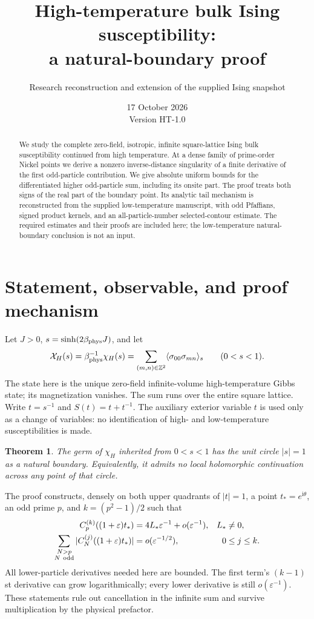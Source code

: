 \documentclass[11pt]{article}
\title{High-temperature bulk Ising susceptibility:\\a natural-boundary proof}
\author{Research reconstruction and extension of the supplied Ising snapshot}
\date{17 October 2026\\Version HT-1.0}
\numberwithin{equation}{section}
\newtheorem{theorem}{Theorem}[section]
\theoremstyle{definition}
\newcommand{\ii}{\mathrm i}
\newcommand{\Z}{\mathbb Z}
\newcommand{\eps}{\varepsilon}
\begin{document}
\maketitle
\begin{abstract}
We study the complete zero-field, isotropic, infinite square-lattice
Ising bulk susceptibility continued from high temperature. At a dense
family of prime-order Nickel points we derive a nonzero inverse-distance
singularity of a finite derivative of the first odd-particle contribution.
We give absolute uniform bounds for the differentiated higher odd-particle
sum, including its onsite part. The proof treats both signs of the real
part of the boundary point. Its analytic tail mechanism is reconstructed
from the supplied low-temperature manuscript, with odd Pfaffians,
signed product kernels, and an all-particle-number selected-contour
estimate. The required estimates and their proofs are included here;
the low-temperature natural-boundary conclusion is not an input.
\end{abstract}

\section{Statement, observable, and proof mechanism}\label{sec:scope}
Let $J>0$, $s=\sinh(2\beta_{\rm phys}J)$, and let
\[
 \mathcal X_H(s)=\beta_{\rm phys}^{-1}\chi_H(s)
 =\sum_{(m,n)\in\Z^2}\langle\sigma_{00}\sigma_{mn}\rangle_s
 \qquad(0<s<1).
\]
The state here is the unique zero-field infinite-volume high-temperature
Gibbs state; its magnetization vanishes. The sum runs over the entire
square lattice. Write $t=s^{-1}$ and $S(t)=t+t^{-1}$. The auxiliary
exterior variable $t$ is used only as a change of variables: no
identification of high- and low-temperature susceptibilities is made.

\begin{theorem}\label{thm:main}
The germ of $\chi_H$ inherited from $0<s<1$ has the unit circle
$|s|=1$ as a natural boundary. Equivalently, it admits no local
holomorphic continuation across any point of that circle.
\end{theorem}

The proof constructs, densely on both upper quadrants of $|t|=1$,
a point $t_*=e^{\ii\theta}$, an odd prime $p$, and
$k=(p^2-1)/2$ such that
\begin{align}
 C_p^{(k)}((1+\eps)t_*)&=4L_*\eps^{-1}+o(\eps^{-1}),
       &L_*&\ne0,\label{eq:roadmapfirst}\\
 \sum_{\substack{N>p\\N\ {\rm odd}}}
 |C_N^{(j)}((1+\eps)t_*)|&=o(\eps^{-1/2}),
       &0&\le j\le k.\label{eq:roadmaptail}
\end{align}
All lower-particle derivatives needed here are bounded. The first term's
$(k-1)$st derivative can grow logarithmically; every lower derivative
is still $o(\eps^{-1})$. These statements rule out cancellation in the
infinite sum and survive multiplication by the physical prefactor.
\end{document}
